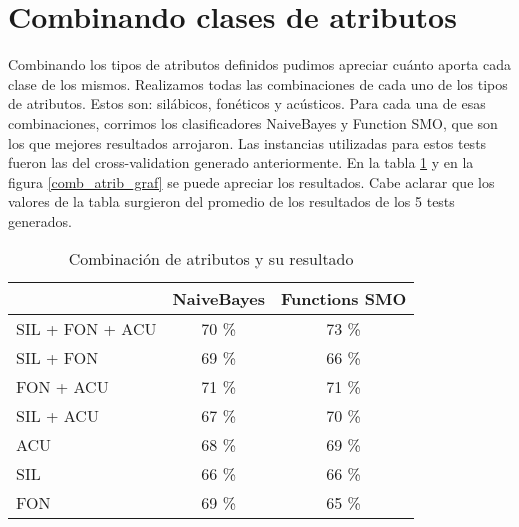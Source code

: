 \section{Combinando clases de atributos}

Combinando los tipos de atributos definidos pudimos apreciar cuánto aporta cada clase de los mismos. Realizamos todas las combinaciones de cada uno de los tipos de atributos. Estos son: silábicos, fonéticos y acústicos. Para cada una de esas combinaciones, corrimos los clasificadores NaiveBayes y Function SMO, que son los que mejores resultados arrojaron. Las instancias utilizadas para estos tests fueron las del cross-validation generado anteriormente. En la tabla \ref{comb_atrib} y en la figura \ref{comb_atrib_graf} se puede apreciar los resultados. Cabe aclarar que los valores de la tabla surgieron del promedio de los resultados de los 5 tests generados.  



\begin{table}[H]
\centering
\begin{tabular}{|l|c|c|}
\hline
\textbf{} & \textbf{NaiveBayes} & \textbf{Functions SMO}   \\ \hline
SIL + FON + ACU & 70 \% & 73 \% \\ \hline
SIL + FON & 69 \% & 66 \% \\ \hline
FON + ACU & 71 \% & 71 \% \\ \hline
SIL + ACU & 67 \% & 70 \% \\ \hline
ACU & 68 \% & 69 \% \\ \hline
SIL & 66 \% & 66 \% \\ \hline
FON & 69 \% & 65 \% \\ \hline
\end{tabular}
\caption{Combinación de atributos y su resultado}
\label{comb_atrib}
\end{table}


